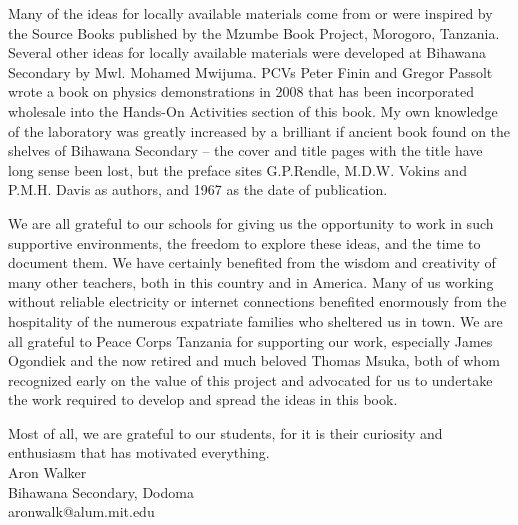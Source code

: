 Many of the ideas for locally available materials 
come from or were inspired by the Source Books 
published by the Mzumbe Book Project, Morogoro, Tanzania. 
Several other ideas for locally available materials 
were developed at Bihawana Secondary by Mwl. Mohamed Mwijuma. 
PCVs Peter Finin and Gregor Passolt wrote 
a book on physics demonstrations in 2008 
that has been incorporated wholesale 
into the Hands-On Activities section of this book. 
My own knowledge of the laboratory was greatly increased 
by a brilliant if ancient book found on the shelves of Bihawana Secondary – 
the cover and title pages with the title have long sense been lost, 
but the preface sites G.P.Rendle, M.D.W. Vokins and P.M.H. Davis as authors, 
and 1967 as the date of publication.

We are all grateful to our schools 
for giving us the opportunity to work in such supportive environments, 
the freedom to explore these ideas, 
and the time to document them. 
We have certainly benefited from the wisdom 
and creativity of many other teachers, 
both in this country and in America. 
Many of us working without reliable electricity 
or internet connections benefited enormously 
from the hospitality of the numerous expatriate families 
who sheltered us in town. 
We are all grateful to Peace Corps Tanzania for supporting our work, 
especially James Ogondiek and the now retired and much beloved Thomas Msuka, 
both of whom recognized early on the value of this project 
and advocated for us to undertake the work required to develop 
and spread the ideas in this book.

Most of all, we are grateful to our students, 
for it is their curiosity and enthusiasm that has motivated everything.\\[24pt]
Aron Walker\\
Bihawana Secondary, Dodoma\\
aronwalk@alum.mit.edu
